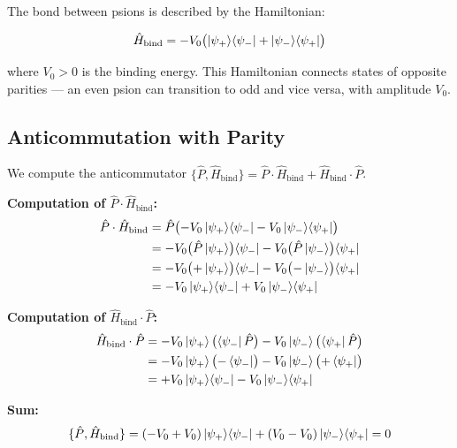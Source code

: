 \documentclass[12pt,a4paper,twoside]{article}
\newcommand{\psion}{\psi}
\begin{document}
The bond between psions is described by the Hamiltonian:
\begin{equationbox}[title={Psionic Binding Hamiltonian}]
\begin{equation}
\hat{H}_{\text{bind}} = -V_0\bigl(\ket{\psion_+}\!\bra{\psion_-} + \ket{\psion_-}\!\bra{\psion_+}\bigr)
\label{eq:hamiltoniano_lig}
\end{equation}
\end{equationbox}

\noindent where $V_0 > 0$ is the binding energy. This Hamiltonian connects states of opposite parities --- an even psion can transition to odd and vice versa, with amplitude $V_0$.

\subsection{Anticommutation with Parity}

We compute the anticommutator $\{\hat{P}, \hat{H}_{\text{bind}}\} = \hat{P}\cdot\hat{H}_{\text{bind}} + \hat{H}_{\text{bind}}\cdot\hat{P}$.

\medskip
\noindent\textbf{Computation of $\hat{P}\cdot\hat{H}_{\text{bind}}$:}
\begin{align}
\hat{P}\cdot\hat{H}_{\text{bind}} &= \hat{P}\bigl(-V_0\ket{\psion_+}\!\bra{\psion_-} - V_0\ket{\psion_-}\!\bra{\psion_+}\bigr) \notag \\
&= -V_0\bigl(\hat{P}\ket{\psion_+}\bigr)\!\bra{\psion_-} - V_0\bigl(\hat{P}\ket{\psion_-}\bigr)\!\bra{\psion_+} \notag \\
&= -V_0\bigl(+\ket{\psion_+}\bigr)\!\bra{\psion_-} - V_0\bigl(-\ket{\psion_-}\bigr)\!\bra{\psion_+} \notag \\
&= -V_0\ket{\psion_+}\!\bra{\psion_-} + V_0\ket{\psion_-}\!\bra{\psion_+}
\label{eq:PH}
\end{align}

\medskip
\noindent\textbf{Computation of $\hat{H}_{\text{bind}}\cdot\hat{P}$:}
\begin{align}
\hat{H}_{\text{bind}}\cdot\hat{P} &= -V_0\ket{\psion_+}\bigl(\bra{\psion_-}\hat{P}\bigr) - V_0\ket{\psion_-}\bigl(\bra{\psion_+}\hat{P}\bigr) \notag \\
&= -V_0\ket{\psion_+}\bigl(-\bra{\psion_-}\bigr) - V_0\ket{\psion_-}\bigl(+\bra{\psion_+}\bigr) \notag \\
&= +V_0\ket{\psion_+}\!\bra{\psion_-} - V_0\ket{\psion_-}\!\bra{\psion_+}
\label{eq:HP}
\end{align}

\medskip
\noindent\textbf{Sum:}
\begin{equation}
\{\hat{P}, \hat{H}_{\text{bind}}\} = (-V_0 + V_0)\ket{\psion_+}\!\bra{\psion_-} + (V_0 - V_0)\ket{\psion_-}\!\bra{\psion_+} = 0
\label{eq:anticomutador_zero}
\end{equation}
\end{document}
